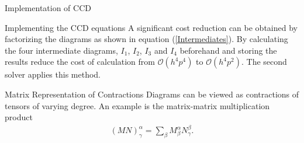 \documentclass[twoside,english]{uiofysmaster}
\begin{document}
\begin{chapter}{Implementation of CCD}
\begin{section}{Implementing the CCD equations}
		A significant cost reduction can be obtained by
                factorizing the diagrams as shown in equation
                (\ref{Intermediates}). By calculating the four
                intermediate diagrams, $I_1$, $I_2$, $I_3$ and $I_4$
                beforehand and storing the results reduce the cost of
                calculation from $\mathcal{O}(h^4 p^4)$ to
                $\mathcal{O}(h^4 p^2)$. The second solver applies this
                method.

	\end{section}

	\begin{section}{Matrix Representation of Contractions}
		Diagrams can be viewed as contractions of tensors of
                varying degree. An example is the matrix-matrix
                multiplication product
		\begin{align}
		 	\left( M N \right)_{\gamma}^{\alpha} = \sum_{\beta} M_{\beta}^\alpha N_\gamma^\beta .
		 	\label{matrix matrix multiplication}
		\end{align} 


\end{section}
\end{chapter}
\end{document}
